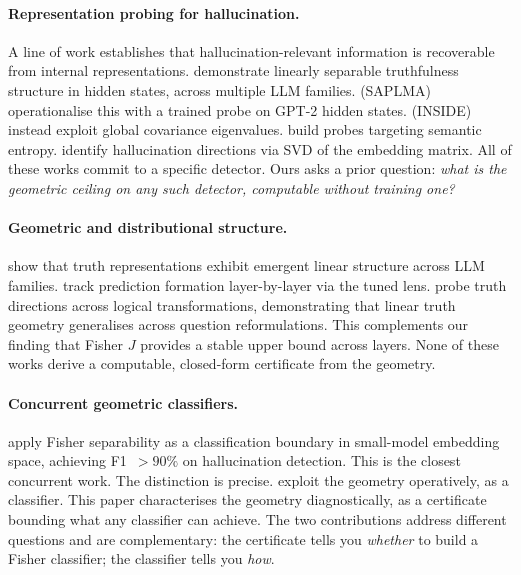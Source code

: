\documentclass[onecolumn]{jmlr}
\begin{document}
\paragraph{Representation probing for hallucination.}
A line of work establishes that hallucination-relevant information is
recoverable from internal representations. \citet{burns2022discovering}
demonstrate linearly separable truthfulness structure in hidden states,
across multiple LLM families. \citet{azaria2023internal} (SAPLMA)
operationalise this with a trained probe on GPT-2 hidden states.
\citet{chen2024inside} (INSIDE) instead exploit global covariance
eigenvalues. \citet{kossen2024semantic} build probes targeting semantic
entropy. \citet{du2024haloscope} identify hallucination directions via
SVD of the embedding matrix. All of these works commit to a specific
detector. Ours asks a prior question: \emph{what is the geometric
ceiling on any such detector, computable without training one?}

\paragraph{Geometric and distributional structure.}
\citet{marks2024geometry} show that truth representations exhibit
emergent linear structure across LLM families. \citet{belrose2023eliciting}
track prediction formation layer-by-layer via the tuned lens.
\citet{bao2025probing} probe truth directions across logical
transformations, demonstrating that linear truth geometry generalises
across question reformulations. This complements our finding that
Fisher $J$ provides a stable upper bound across layers. None of these
works derive a computable, closed-form certificate from the geometry.

\paragraph{Concurrent geometric classifiers.}
\citet{ricco2026geometric} apply Fisher separability as a
classification boundary in small-model embedding space, achieving
F1~$>90\%$ on hallucination detection. This is the closest concurrent
work. The distinction is precise. \citeauthor{ricco2026geometric}
exploit the geometry operatively, as a classifier. This paper
characterises the geometry diagnostically, as a certificate bounding
what any classifier can achieve. The two contributions address
different questions and are complementary: the certificate tells you
\emph{whether} to build a Fisher classifier; the classifier tells you
\emph{how}.
\end{document}
